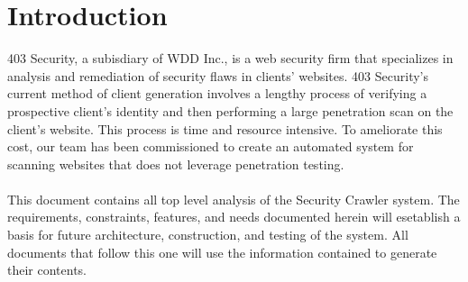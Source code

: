\section{Introduction}
403 Security, a subisdiary of WDD Inc., is a web security firm that specializes in analysis and remediation of security flaws in clients' websites.  403 Security's current method of client generation involves a lengthy process of verifying a prospective client's identity and then performing a large penetration scan on the client's website.  This process is time and resource intensive.  To ameliorate this cost, our team has been commissioned to create an automated system for scanning websites that does not leverage penetration testing.\\\\
This document contains all top level analysis of the Security Crawler system.  The requirements, constraints, features, and needs documented herein will esetablish a basis for future architecture, construction, and testing of the system.  All documents that follow this one will use the information contained to generate their contents.
